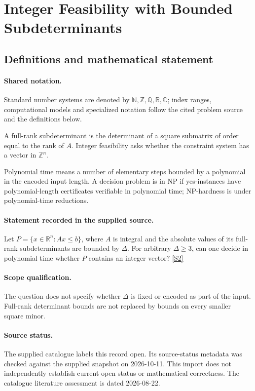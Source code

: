\documentclass[11pt]{article}
\newcommand{\sref}[2]{\hyperlink{source:#1:#2}{[S#2]}}
\begin{document}
\section{Integer Feasibility with Bounded Subdeterminants}\label{statement}

\subsection{Definitions and mathematical statement}

\paragraph{Shared notation.}Standard number systems are denoted by $\mathbb N,\mathbb Z,\mathbb Q,\mathbb R,\mathbb C$; index ranges, computational models and specialized notation follow the cited problem source and the definitions below.


A full-rank subdeterminant is the determinant of a square submatrix of order equal to the rank of $A$. Integer feasibility asks whether the constraint system has a vector in $\mathbb Z^n$.

Polynomial time means a number of elementary steps bounded by a polynomial in the encoded input length. A decision problem is in $\mathrm{NP}$ if yes-instances have polynomial-length certificates verifiable in polynomial time; NP-hardness is under polynomial-time reductions.
\paragraph{Statement recorded in the supplied source.}
Let $P=\{x\in\mathbb R^n:Ax\leq b\}$, where $A$ is integral and the absolute values of its full-rank subdeterminants are bounded by $\Delta$. For arbitrary $\Delta\geq3$, can one decide in polynomial time whether $P$ contains an integer vector? \sref{statement}{2}
\paragraph{Scope qualification.}
The question does not specify whether $\Delta$ is fixed or encoded as part of the input. Full-rank determinant bounds are not replaced by bounds on every smaller square minor.
\paragraph{Source status.}
The supplied catalogue labels this record open. Its source-status metadata was checked against the supplied snapshot on 2026-10-11. This import does not independently establish current open status or mathematical correctness. The catalogue literature assessment is dated 2026-08-22.
\end{document}
